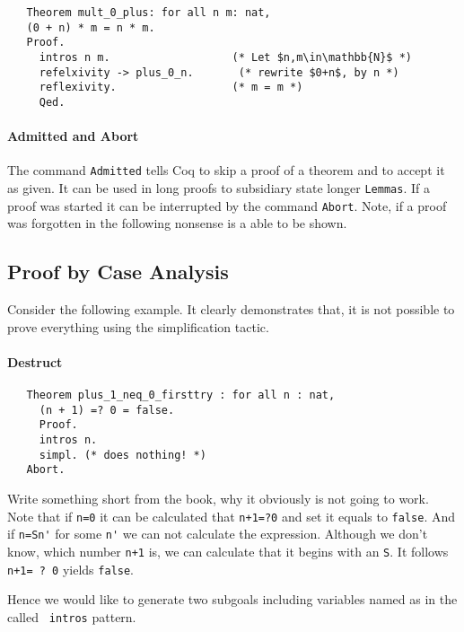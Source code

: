    \begin{lstlisting}
   Theorem mult_0_plus: for all n m: nat,
   (0 + n) * m = n * m.
   Proof.
     intros n m.                   (* Let $n,m\in\mathbb{N}$ *) 
     refelxivity -> plus_0_n.       (* rewrite $0+n$, by n *)
     reflexivity.                  (* m = m *)
     Qed.
   \end{lstlisting}   

	\paragraph{Admitted and Abort}
	
	The command \lstinline!Admitted! tells Coq to skip a proof of a theorem and to accept it as given.
	It can be used in long proofs to subsidiary state longer \lstinline!Lemmas!.
	If a proof was started it can be interrupted by the command \lstinline!Abort!.
	Note, if a proof was forgotten in the following nonsense is a able to be shown. \\
	
	
 \subsection{Proof by Case Analysis}
   Consider the following example. It clearly demonstrates that, it is not possible to prove everything using the simplification tactic.   
   
   
   \paragraph{Destruct}	
   \begin{lstlisting}
   Theorem plus_1_neq_0_firsttry : for all n : nat,
     (n + 1) =? 0 = false.
     Proof.
     intros n.
     simpl. (* does nothing! *)
   Abort.
   \end{lstlisting}
	Write something short from the book, why it obviously is not going to work.\\
	
	Note that if \lstinline!n=0! it can be calculated that \lstinline!n+1=?0! and set it equals to  \lstinline!false!. 
	And if \lstinline!n=Sn'! for some \lstinline!n'! we can not calculate the expression.
	Although we don't know, which number \lstinline!n+1! is, we can calculate that it begins with an \lstinline!S!.
	It follows \lstinline!n+1= ? 0! yields \lstinline!false!.
	
    Hence we would like to generate two subgoals including variables named as in the called \lstinline! intros! pattern.	   
        
